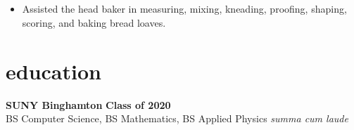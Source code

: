\documentclass{article}
\newcommand{\subsubsectiontext}[1]{#1}
\begin{document}
\subsection{}
\subsubsectiontext{
    \begin{itemize}
        \item Assisted the head baker in measuring, mixing, kneading, proofing, shaping, scoring, and baking bread loaves.
    \end{itemize}
}































































\section{education}

\noindent \textbf{SUNY Binghamton} \hfill \textbf{Class of 2020}\\
BS Computer Science, BS Mathematics, BS Applied Physics \hfill \textit{summa cum laude}
\end{document}

